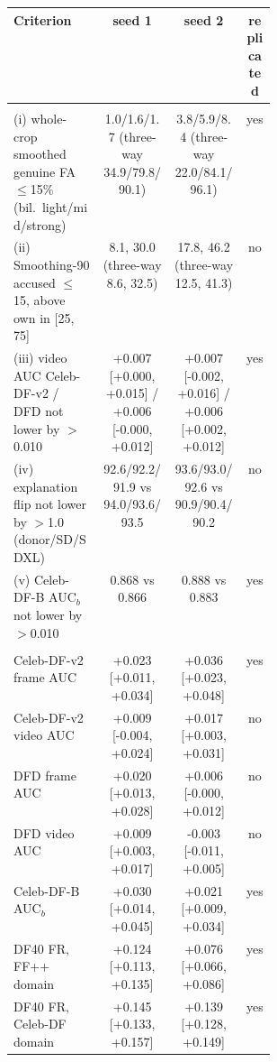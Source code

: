 \begin{tabular}{@{}>{\raggedright\arraybackslash}p{0.34\linewidth} c c c@{}}
\toprule
Criterion & seed 1 & seed 2 & replicated \\
\midrule
\multicolumn{4}{@{}l}{(A) symmetric-view variant against \oursF{}, same seed} \\
(i) whole-crop smoothed genuine FA $\le$15\% (bil.\ light/mid/strong) & 1.0/1.6/1.7 (three-way 34.9/79.8/90.1) & 3.8/5.9/8.4 (three-way 22.0/84.1/96.1) & yes \\
(ii) Smoothing-90 accused $\le$15, above own in [25, 75] & 8.1, 30.0 (three-way 8.6, 32.5) & 17.8, 46.2 (three-way 12.5, 41.3) & no \\
(iii) video AUC Celeb-DF-v2 / DFD not lower by $>$0.010 & +0.007 [+0.000, +0.015] / +0.006 [-0.000, +0.012] & +0.007 [-0.002, +0.016] / +0.006 [+0.002, +0.012] & yes \\
(iv) explanation flip not lower by $>$1.0 (donor/SD/SDXL) & 92.6/92.2/91.9 vs 94.0/93.6/93.5 & 93.6/93.0/92.6 vs 90.9/90.4/90.2 & no \\
(v) Celeb-DF-B AUC$_b$ not lower by $>$0.010 & 0.868 vs 0.866 & 0.888 vs 0.883 & yes \\
\midrule
\multicolumn{4}{@{}l}{(B) \oursB{} minus \oursF{}, same seed} \\
Celeb-DF-v2 frame AUC & +0.023 [+0.011, +0.034] & +0.036 [+0.023, +0.048] & yes \\
Celeb-DF-v2 video AUC & +0.009 [-0.004, +0.024] & +0.017 [+0.003, +0.031] & no \\
DFD frame AUC & +0.020 [+0.013, +0.028] & +0.006 [-0.000, +0.012] & no \\
DFD video AUC & +0.009 [+0.003, +0.017] & -0.003 [-0.011, +0.005] & no \\
Celeb-DF-B AUC$_b$ & +0.030 [+0.014, +0.045] & +0.021 [+0.009, +0.034] & yes \\
DF40 FR, FF++ domain & +0.124 [+0.113, +0.135] & +0.076 [+0.066, +0.086] & yes \\
DF40 FR, Celeb-DF domain & +0.145 [+0.133, +0.157] & +0.139 [+0.128, +0.149] & yes \\
\bottomrule
\end{tabular}
